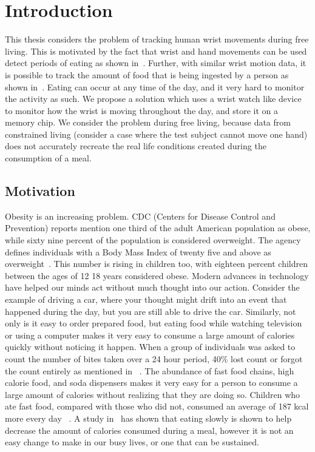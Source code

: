 
\chapter{Introduction}
\label{Chap:Intro}
This thesis considers the problem of tracking human wrist movements during free living.
This is motivated by the fact that wrist and hand movements can be used detect periods of eating
as shown in~\cite{dong2013detecting}. Further, with similar wrist motion data,
it is possible to track the amount of food that is being ingested by a person as shown in~\cite{dong2012new}.
Eating can occur at any time of the day, and it very hard to monitor the activity as such.
We propose a solution which uses a wrist watch like device to monitor how the wrist is moving throughout the day,
and store it on a memory chip. We consider the problem during free living,
because data from constrained living (consider a case where the test subject cannot move one hand)
does not accurately recreate the real life conditions created during the consumption of a meal.
\section{Motivation}
\label{Sec:Motivation}

 Obesity is an increasing problem. CDC (Centers for Disease Control and Prevention) reports mention one
 \textemdash{} third of the adult American population as 
 obese, while sixty nine percent of the population is considered 
 overweight. The agency defines individuals with a Body Mass
 Index of twenty five and above as overweight~\cite{ogden2010prevalence}.
 This number is rising in children too, with eighteen
 percent children between the ages of 12 \textemdash{} 18
 years considered obese. Modern advances in technology
 have helped our minds act without much thought into our action.
 Consider the example of driving a car, where your thought might drift
 into an event that happened during the day, but you are still able to drive the car.
 Similarly, not only is it easy to order prepared food, but eating
 food while watching television or using a computer makes
 it very easy to consume a large amount of calories quickly without
 noticing it happen. When a group
 of individuals was asked to count the number of bites taken over
 a 24 hour period, 40\% lost count or forgot the count entirely as mentioned in ~\cite{mahoney1975obese}.
 The abundance of fast food chains, high calorie food, and soda dispensers makes it very easy
 for a person to consume a large amount of calories without realizing 
 that they are doing so. Children who ate fast food, compared with those who did not,
 consumed an average of 187 kcal more every day ~\cite{bowman2004effects}.
 A study in~\cite{Andrade2008} has shown that eating slowly is shown to help decrease the amount of calories
 consumed during a meal, however it is not an
 easy change to make in our busy lives, or one that can be sustained.

